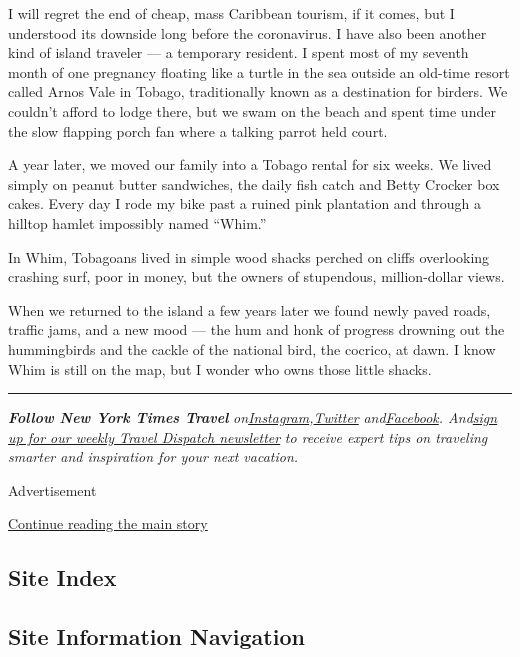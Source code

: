 I will regret the end of cheap, mass Caribbean tourism, if it comes, but
I understood its downside long before the coronavirus. I have also been
another kind of island traveler --- a temporary resident. I spent most
of my seventh month of one pregnancy floating like a turtle in the sea
outside an old-time resort called Arnos Vale in Tobago, traditionally
known as a destination for birders. We couldn't afford to lodge there,
but we swam on the beach and spent time under the slow flapping porch
fan where a talking parrot held court.

A year later, we moved our family into a Tobago rental for six weeks. We
lived simply on peanut butter sandwiches, the daily fish catch and Betty
Crocker box cakes. Every day I rode my bike past a ruined pink
plantation and through a hilltop hamlet impossibly named ``Whim.''

In Whim, Tobagoans lived in simple wood shacks perched on cliffs
overlooking crashing surf, poor in money, but the owners of stupendous,
million-dollar views.

When we returned to the island a few years later we found newly paved
roads, traffic jams, and a new mood --- the hum and honk of progress
drowning out the hummingbirds and the cackle of the national bird, the
cocrico, at dawn. I know Whim is still on the map, but I wonder who owns
those little shacks.

\begin{center}\rule{0.5\linewidth}{\linethickness}\end{center}

\emph{\textbf{Follow New York Times Travel}}
\emph{on}\href{https://www.instagram.com/nytimestravel/}{\emph{Instagram}}\emph{,}\href{https://twitter.com/nytimestravel}{\emph{Twitter}}
\emph{and}\href{https://www.facebookcorewwwi.onion/nytimestravel/}{\emph{Facebook}}\emph{.
And}\href{https://www.nytimes3xbfgragh.onion/newsletters/traveldispatch}{\emph{sign
up for our weekly Travel Dispatch newsletter}} \emph{to receive expert
tips on traveling smarter and inspiration for your next vacation.}

Advertisement

\protect\hyperlink{after-bottom}{Continue reading the main story}

\hypertarget{site-index}{%
\subsection{Site Index}\label{site-index}}

\hypertarget{site-information-navigation}{%
\subsection{Site Information
Navigation}\label{site-information-navigation}}

